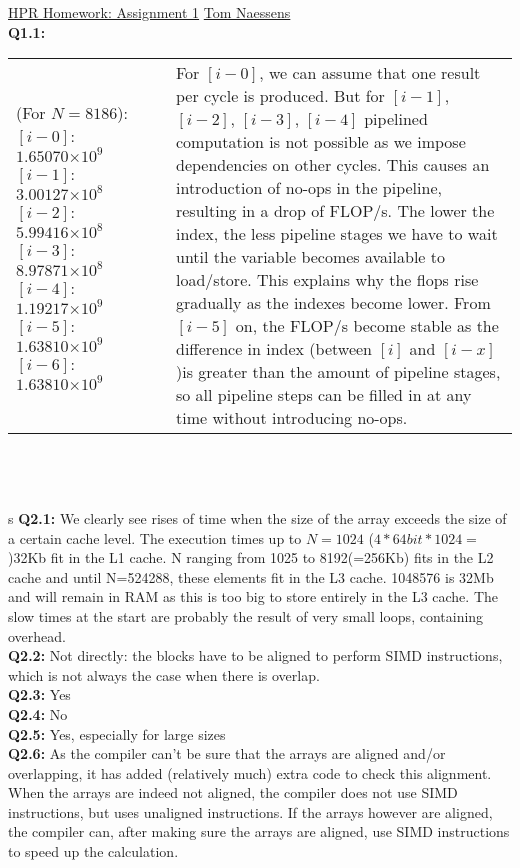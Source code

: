 \documentclass[10pt,a4paper]{article}
\author{Tom Naessens}
\providecommand{\e}[1]{\ensuremath{\times 10^{#1}}}
\begin{document}
\pagestyle{empty}

\underline{HPR Homework: Assignment 1}  \hfill \underline{Tom Naessens}\\

\textbf{Q1.1:}\\
\begin{tabular}{p{3cm}|p{12cm}}
(For $N = 8186$):
$[i-0]$: $1.65070\e{9}$
$[i-1]$: $3.00127\e{8}$ 
$[i-2]$: $5.99416\e{8}$ 
$[i-3]$: $8.97871\e{8}$ 
$[i-4]$: $1.19217\e{9}$ 
$[i-5]$: $1.63810\e{9}$ 
$[i-6]$: $1.63810\e{9}$ 
& 
For $[i-0]$, we can assume that one result per cycle is produced. But for $[i-1]$, $[i-2]$, $[i-3]$, $[i-4]$ pipelined computation is not possible as we impose dependencies on other cycles. This causes an introduction of no-ops in the pipeline, resulting in a drop of FLOP/s. The lower the index, the less pipeline stages we have to wait until the variable becomes available to load/store. This explains why the flops rise gradually as the indexes become lower. From $[i-5]$ on, the FLOP/s become stable as the difference in index (between $[i]$ and $[i-x]$)is greater than the amount of pipeline stages, so all pipeline steps can be filled in at any time without introducing no-ops.
\end{tabular} 
\\
\\
\\s
\textbf{Q2.1:} We clearly see rises of time when the size of the array exceeds the size of a certain cache level. The execution times up to $N=1024$ ($4*64bit*1024=$)32Kb fit in the L1 cache. N ranging from 1025 to 8192(=256Kb) fits in the L2 cache and until N=524288, these elements fit in the L3 cache. 1048576 is 32Mb and will remain in RAM as this is too big to store entirely in the L3 cache. The slow times at the start are probably the result of very small loops, containing overhead.
\\
\textbf{Q2.2:} Not directly: the blocks have to be aligned to perform SIMD instructions, which is not always the case when there is overlap.
\\
\textbf{Q2.3:} Yes
\\
\textbf{Q2.4:} No
\\
\textbf{Q2.5:} Yes, especially for large sizes
\\
\textbf{Q2.6:} As the compiler can't be sure that the arrays are aligned and/or overlapping, it has added (relatively much) extra code to check this alignment. When the arrays are indeed not aligned, the compiler does not use SIMD instructions, but uses unaligned instructions. If the arrays however are aligned, the compiler can, after making sure the arrays are aligned, use SIMD instructions to speed up the calculation.
\end{document}

